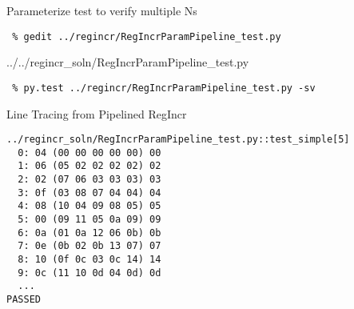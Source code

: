 \begin{task}\begin{frame}[fragile]{Parameterize test to verify multiple Ns}

\vspace{-0.15in}
\begin{Verbatim}[commandchars=\\\{\}]
 % cd \midtilde/pymtl-tut/build
 % gedit ../regincr/RegIncrParamPipeline_test.py
\end{Verbatim}
\vspace{-0.17in}

%
{../../regincr_soln/RegIncrParamPipeline_test.py}

\vspace{-0.2in}
\begin{Verbatim}
 % py.test ../regincr/RegIncrParamPipeline_test.py -sv
\end{Verbatim}

\end{frame}
\end{task}

\begin{frame}[fragile]{Line Tracing from Pipelined RegIncr}

\begin{Verbatim}
../regincr_soln/RegIncrParamPipeline_test.py::test_simple[5]
  0: 04 (00 00 00 00 00) 00
  1: 06 (05 02 02 02 02) 02
  2: 02 (07 06 03 03 03) 03
  3: 0f (03 08 07 04 04) 04
  4: 08 (10 04 09 08 05) 05
  5: 00 (09 11 05 0a 09) 09
  6: 0a (01 0a 12 06 0b) 0b
  7: 0e (0b 02 0b 13 07) 07
  8: 10 (0f 0c 03 0c 14) 14
  9: 0c (11 10 0d 04 0d) 0d
  ...
PASSED
\end{Verbatim}

\end{frame}

